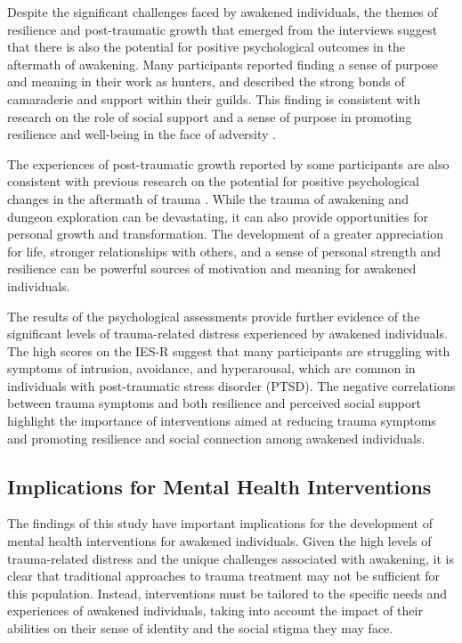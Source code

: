\documentclass[12pt, a4paper]{article}
\begin{document}
Despite the significant challenges faced by awakened individuals, the themes of resilience and post-traumatic growth that emerged from the interviews suggest that there is also the potential for positive psychological outcomes in the aftermath of awakening. Many participants reported finding a sense of purpose and meaning in their work as hunters, and described the strong bonds of camaraderie and support within their guilds. This finding is consistent with research on the role of social support and a sense of purpose in promoting resilience and well-being in the face of adversity \citep{Southwick2005, McKnight2009}.

The experiences of post-traumatic growth reported by some participants are also consistent with previous research on the potential for positive psychological changes in the aftermath of trauma \citep{Tedeschi2004}. While the trauma of awakening and dungeon exploration can be devastating, it can also provide opportunities for personal growth and transformation. The development of a greater appreciation for life, stronger relationships with others, and a sense of personal strength and resilience can be powerful sources of motivation and meaning for awakened individuals.

The results of the psychological assessments provide further evidence of the significant levels of trauma-related distress experienced by awakened individuals. The high scores on the IES-R suggest that many participants are struggling with symptoms of intrusion, avoidance, and hyperarousal, which are common in individuals with post-traumatic stress disorder (PTSD). The negative correlations between trauma symptoms and both resilience and perceived social support highlight the importance of interventions aimed at reducing trauma symptoms and promoting resilience and social connection among awakened individuals.

\subsection{Implications for Mental Health Interventions}
The findings of this study have important implications for the development of mental health interventions for awakened individuals. Given the high levels of trauma-related distress and the unique challenges associated with awakening, it is clear that traditional approaches to trauma treatment may not be sufficient for this population. Instead, interventions must be tailored to the specific needs and experiences of awakened individuals, taking into account the impact of their abilities on their sense of identity and the social stigma they may face.
\end{document}
